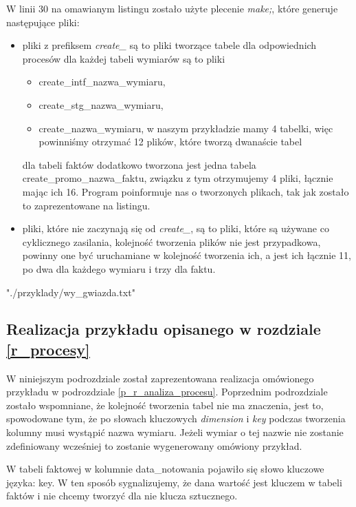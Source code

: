 W linii 30 na omawianym listingu zostało użyte plecenie \textit{make;},
 które generuje następujące pliki:
  \begin{itemize}
   \item 
      pliki z prefiksem \textit{create\_} są to pliki tworzące tabele dla odpowiednich procesów
      dla każdej tabeli wymiarów są to pliki 
        \begin{itemize}
         \item  create\_intf\_nazwa\_wymiaru,
         \item  create\_stg\_nazwa\_wymiaru,
         \item  create\_nazwa\_wymiaru,
      w naszym przykładzie mamy 4 tabelki, więc powinniśmy otrzymać 12 plików, które tworzą dwanaście tabel
        \end{itemize}
      dla tabeli faktów dodatkowo tworzona jest jedna tabela create\_promo\_nazwa\_faktu,
      związku z tym otrzymujemy 4 pliki,
      łącznie mając ich 16. Program poinformuje nas o tworzonych plikach,
      tak jak zostało to zaprezentowane na listingu.
   \item 
      pliki, które nie zaczynają się od \textit{create\_},
      są to pliki, które są używane co cyklicznego zasilania,
      kolejność tworzenia plików nie jest przypadkowa,
      powinny one być uruchamiane w kolejność tworzenia ich,
      a jest ich łącznie 11, po dwa dla każdego wymiaru i trzy dla faktu.
  \end{itemize}


 {"./przyklady/wy_gwiazda.txt"}
\subsection{Realizacja przykładu opisanego w rozdziale \ref{r_procesy}  }

W niniejszym podrozdziale został zaprezentowana realizacja omówionego przykładu w podrozdziale \ref{p_r_analiza_procesu}.
Poprzednim podrozdziale zostało wspomniane, że kolejność tworzenia tabel nie ma znaczenia,
 jest to, spowodowane tym, że po słowach kluczowych  \textit{dimension} i  \textit{key} 
 podczas tworzenia kolumny musi wystąpić nazwa wymiaru. 
Jeżeli wymiar o tej nazwie nie zostanie zdefiniowany wcześniej to zostanie wygenerowany omówiony przykład.

W tabeli faktowej w kolumnie data\_notowania pojawiło się słowo kluczowe języka: key.
W ten sposób sygnalizujemy,
 że dana wartość jest kluczem w tabeli faktów
 i nie chcemy tworzyć dla nie klucza sztucznego. 


